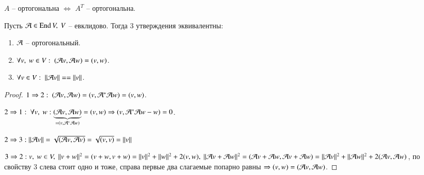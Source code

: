 \documentclass[main]{subfiles}
\begin{document}
\begin{remark}
    $A$ -- ортогональна $\Leftrightarrow$ $A^T$ -- ортогональна.
\end{remark}

\begin{proposition}
    Пусть $\mathcal{A} \in \operatorname{End} V, \ V$ -- евклидово. Тогда 3 утверждения эквивалентны:
    \begin{enumerate}
        \item $\mathcal{A}$ -- ортогональный.
        \item $\forall v, \ w \in V: \ (\mathcal{A} v, \mathcal{A} w) = (v, w)$.
        \item $\forall v \in V: \ ||\mathcal{A} v|| == ||v||$.
    \end{enumerate}
\end{proposition}

\begin{proof}
    $1 \Rightarrow 2: \ (\mathcal{A} v, \mathcal{A} w) = (v, \mathcal{A}^* \mathcal{A} w) = (v, w)$.

    $2 \Rightarrow 1: \ \forall v, \ w: \underbrace{(\mathcal{A} v, \mathcal{A} w)}_{= (v, \mathcal{A}^* \mathcal{A} w)} = (v, w) \Rightarrow (v, \mathcal{A}^* \mathcal{A} w - w) = 0$.

    $2 \Rightarrow 3: ||\mathcal{A} v|| = \sqrt{(\mathcal{A} v, \mathcal{A} v)} = \sqrt{(v, v)} = ||v||$

    $3 \Rightarrow 2: v, \ w \in V, \ ||v + w||^2 = (v+w, v+w) = ||v||^2 + ||w||^2 + 2(v, w), \
        ||\mathcal{A} v + \mathcal{A} w||^2 = (\mathcal{A} v + \mathcal{A} w, \mathcal{A} v + \mathcal{A} w) = ||\mathcal{A} v||^2 + ||\mathcal{A} w||^2 + 2(\mathcal{A} v, \mathcal{A} w)$,
    по свойству 3 слева стоит одно и тоже, справа первые два слагаемые попарно равны $\Rightarrow (v, w) = (\mathcal{A} v, \mathcal{A} w)$.
\end{proof}
\end{document}
